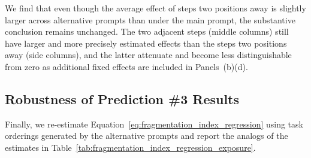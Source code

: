 We find that even though the average effect of steps two positions away is slightly larger across alternative prompts than under the main prompt, the substantive conclusion remains unchanged.
The two adjacent steps (middle columns) still have larger and more precisely estimated effects than the steps two positions away (side columns), and the latter attenuate and become less distinguishable from zero as additional fixed effects are included in Panels~(b)\textendash (d).


\subsection{Robustness of Prediction \#3 Results}
\label{app:gptPrompts_robustness_pred2}

Finally, we re-estimate Equation~\eqref{eq:fragmentation_index_regression} using task orderings generated by the alternative prompts and report the analogs of the estimates in Table~\ref{tab:fragmentation_index_regression_exposure}.

